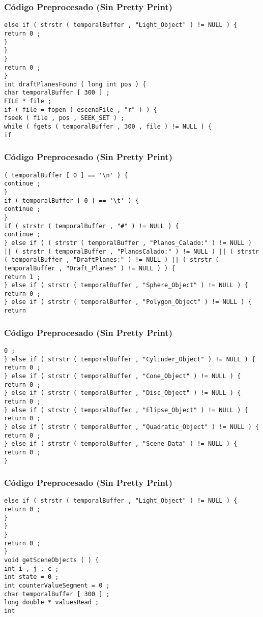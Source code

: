 \documentclass{beamer}
\begin{document}
\begin{frame}[fragile]
\frametitle{C\'odigo Preprocesado (Sin Pretty Print)}
\begin{lstlisting}[style=CStyle]
else if ( strstr ( temporalBuffer , "Light_Object" ) != NULL ) { 
return 0 ; 
} 
} 
} 
return 0 ; 
} 
int draftPlanesFound ( long int pos ) { 
char temporalBuffer [ 300 ] ; 
FILE * file ; 
if ( file = fopen ( escenaFile , "r" ) ) { 
fseek ( file , pos , SEEK_SET ) ; 
while ( fgets ( temporalBuffer , 300 , file ) != NULL ) { 
if \end{lstlisting}
\end{frame}
\begin{frame}[fragile]
\frametitle{C\'odigo Preprocesado (Sin Pretty Print)}
\begin{lstlisting}[style=CStyle]
( temporalBuffer [ 0 ] == '\n' ) { 
continue ; 
} 
if ( temporalBuffer [ 0 ] == '\t' ) { 
continue ; 
} 
if ( strstr ( temporalBuffer , "#" ) != NULL ) { 
continue ; 
} else if ( ( strstr ( temporalBuffer , "Planos_Calado:" ) != NULL ) || ( strstr ( temporalBuffer , "PlanosCalado:" ) != NULL ) || ( strstr ( temporalBuffer , "DraftPlanes:" ) != NULL ) || ( strstr ( temporalBuffer , "Draft_Planes" ) != NULL ) ) { 
return 1 ; 
} else if ( strstr ( temporalBuffer , "Sphere_Object" ) != NULL ) { 
return 0 ; 
} else if ( strstr ( temporalBuffer , "Polygon_Object" ) != NULL ) { 
return \end{lstlisting}
\end{frame}
\begin{frame}[fragile]
\frametitle{C\'odigo Preprocesado (Sin Pretty Print)}
\begin{lstlisting}[style=CStyle]
0 ; 
} else if ( strstr ( temporalBuffer , "Cylinder_Object" ) != NULL ) { 
return 0 ; 
} else if ( strstr ( temporalBuffer , "Cone_Object" ) != NULL ) { 
return 0 ; 
} else if ( strstr ( temporalBuffer , "Disc_Object" ) != NULL ) { 
return 0 ; 
} else if ( strstr ( temporalBuffer , "Elipse_Object" ) != NULL ) { 
return 0 ; 
} else if ( strstr ( temporalBuffer , "Quadratic_Object" ) != NULL ) { 
return 0 ; 
} else if ( strstr ( temporalBuffer , "Scene_Data" ) != NULL ) { 
return 0 ; 
} \end{lstlisting}
\end{frame}
\begin{frame}[fragile]
\frametitle{C\'odigo Preprocesado (Sin Pretty Print)}
\begin{lstlisting}[style=CStyle]
else if ( strstr ( temporalBuffer , "Light_Object" ) != NULL ) { 
return 0 ; 
} 
} 
} 
return 0 ; 
} 
void getSceneObjects ( ) { 
int i , j , c ; 
int state = 0 ; 
int counterValueSegment = 0 ; 
char temporalBuffer [ 300 ] ; 
long double * valuesRead ; 
int \end{lstlisting}
\end{frame}
\end{document}
